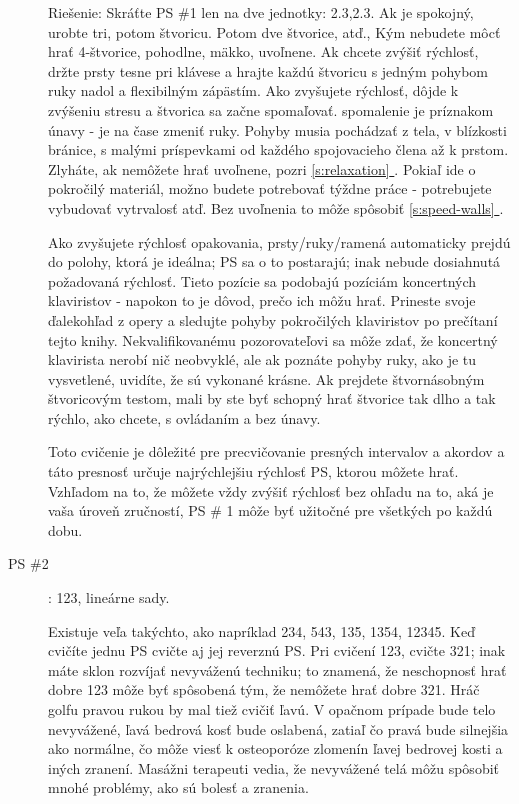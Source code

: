 \documentclass[11pt,a4paper]{book}
\newcommand*{\fullref}[1]{\hyperref[{#1}]{\ref*{#1} \nameref*{#1}}} %
\begin{document}
\begin{description}
Riešenie: Skráťte PS \#1 len na dve jednotky: 2.3,2.3. Ak je spokojný, urobte tri, potom štvoricu. Potom dve štvorice, atď., Kým nebudete môcť hrať 4-štvorice, pohodlne, mäkko, uvoľnene. Ak chcete zvýšiť rýchlosť, držte prsty tesne pri klávese a hrajte každú štvoricu s jedným pohybom ruky nadol a flexibilným zápästím. Ako zvyšujete rýchlosť, dôjde k zvýšeniu stresu a štvorica sa začne spomaľovať. spomalenie je príznakom únavy - je na čase zmeniť ruky. Pohyby musia pochádzať z tela, v blízkosti bránice, s malými príspevkami od každého spojovacieho člena až k prstom. Zlyháte, ak nemôžete hrať uvoľnene, pozri \fullref{s:relaxation}. Pokiaľ ide o pokročilý materiál, možno budete potrebovať týždne práce - potrebujete vybudovať vytrvalosť atď. Bez uvoľnenia to môže spôsobiť \fullref{s:speed-walls}.

Ako zvyšujete rýchlosť opakovania, prsty/ruky/ramená automaticky prejdú do polohy, ktorá je ideálna; PS sa o to postarajú; inak nebude dosiahnutá požadovaná rýchlosť. Tieto pozície sa podobajú pozíciám koncertných klaviristov - napokon to je dôvod, prečo ich môžu hrať. Prineste svoje ďalekohľad z opery a sledujte pohyby pokročilých klaviristov po prečítaní tejto knihy. Nekvalifikovanému pozorovateľovi sa môže zdať, že koncertný klavirista nerobí nič neobvyklé, ale ak poznáte pohyby ruky, ako je tu vysvetlené, uvidíte, že sú vykonané krásne. Ak prejdete štvornásobným štvoricovým testom, mali by ste byť schopný hrať štvorice tak dlho a tak rýchlo, ako chcete, s ovládaním a bez únavy.

Toto cvičenie je dôležité pre precvičovanie presných intervalov a akordov a táto presnosť určuje najrýchlejšiu rýchlosť PS, ktorou môžete hrať. Vzhľadom na to, že môžete vždy zvýšiť rýchlosť bez ohľadu na to, aká je vaša úroveň zručností, PS \# 1 môže byť užitočné pre všetkých po každú dobu.

\item[PS \#2]: 123, lineárne sady.

Existuje veľa takýchto, ako napríklad 234, 543, 135, 1354, 12345. Keď cvičíte jednu PS cvičte aj jej reverznú PS. Pri cvičení 123, cvičte 321; inak máte sklon rozvíjať nevyváženú techniku; to znamená, že neschopnosť hrať dobre 123 môže byť spôsobená tým, že nemôžete hrať dobre 321. Hráč golfu pravou rukou by mal tiež cvičiť ľavú. V opačnom prípade bude telo nevyvážené, ľavá bedrová kosť bude oslabená, zatiaľ čo pravá bude silnejšia ako normálne, čo môže viesť k osteoporóze zlomenín ľavej bedrovej kosti a iných zranení. Masážni terapeuti vedia, že nevyvážené telá môžu spôsobiť mnohé problémy, ako sú bolesť a zranenia.


\end{description}
\end{document}
